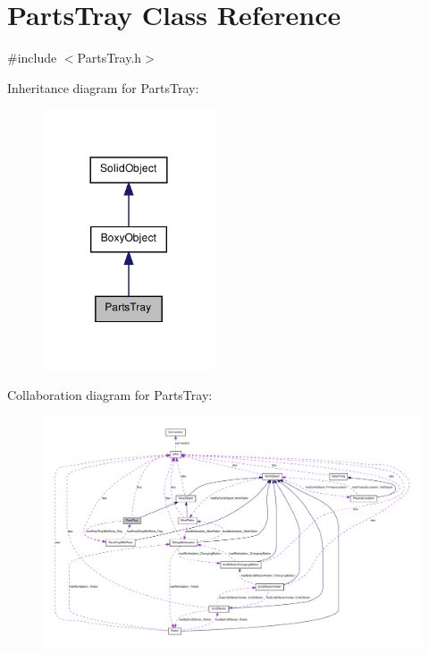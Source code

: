\hypertarget{class_parts_tray}{
\section{PartsTray Class Reference}
\label{class_parts_tray}
}


{\ttfamily \#include $<$PartsTray.h$>$}



Inheritance diagram for PartsTray:\nopagebreak
\begin{figure}[H]
\begin{center}
\leavevmode
\includegraphics[width=144pt]{class_parts_tray__inherit__graph}
\end{center}
\end{figure}


Collaboration diagram for PartsTray:\nopagebreak
\begin{figure}[H]
\begin{center}
\leavevmode
\includegraphics[width=400pt]{class_parts_tray__coll__graph}
\end{center}
\end{figure}
